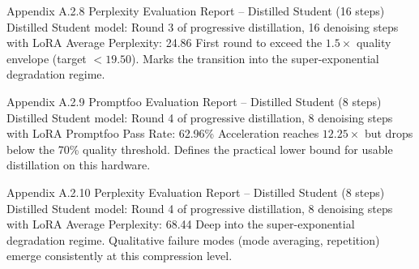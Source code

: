 \documentclass[11pt, a4paper]{article}
\begin{document}
\annexcover%
    {Appendix A.2.8}%
    {Perplexity Evaluation Report – Distilled Student (16 steps)}%
    {Distilled Student model: Round 3 of progressive distillation, 16 denoising steps with LoRA}%
    {Average Perplexity: 24.86}%
    {First round to exceed the $1.5\times$ quality envelope (target $< 19.50$). Marks the transition into the super-exponential degradation regime.}

\annexcover%
    {Appendix A.2.9}%
    {Promptfoo Evaluation Report – Distilled Student (8 steps)}%
    {Distilled Student model: Round 4 of progressive distillation, 8 denoising steps with LoRA}%
    {Promptfoo Pass Rate: 62.96\%}%
    {Acceleration reaches $12.25\times$ but drops below the 70\% quality threshold. Defines the practical lower bound for usable distillation on this hardware.}

\annexcover%
    {Appendix A.2.10}%
    {Perplexity Evaluation Report – Distilled Student (8 steps)}%
    {Distilled Student model: Round 4 of progressive distillation, 8 denoising steps with LoRA}%
    {Average Perplexity: 68.44}%
    {Deep into the super-exponential degradation regime. Qualitative failure modes (mode averaging, repetition) emerge consistently at this compression level.}
\end{document}

